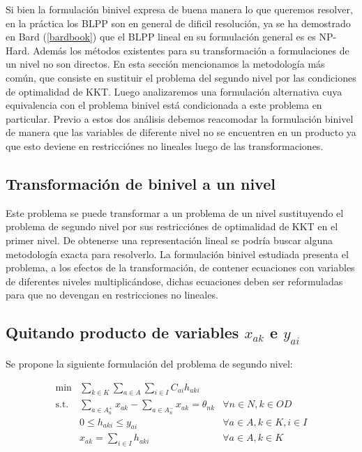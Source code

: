 \documentclass{article}
\begin{document}
  Si bien la formulación binivel expresa de buena manera lo que queremos resolver, en la práctica los BLPP son en general de dificil resolución, ya se ha demostrado en Bard (\ref{bardbook}) que el BLPP lineal en su formulación general es es NP-Hard. Además los métodos existentes para su transformación a formulaciones de un nivel no son directos. En esta sección mencionamos la metodología más común, que consiste en sustituir el problema del segundo nivel por las condiciones de optimalidad de KKT. Luego analizaremos una formulación alternativa cuya equivalencia con el problema binivel está condicionada a este problema en particular. Previo a estos dos análisis debemos reacomodar la formulación binivel de manera que las variables de diferente nivel no se encuentren en un producto ya que esto deviene en restricciónes no lineales luego de las transformaciones.

  \subsection{Transformación de binivel a un nivel}

  Este problema se puede transformar a un problema de un nivel sustituyendo el problema de segundo nivel por sus restricciónes de optimalidad de KKT en el primer nivel. De obtenerse una representación lineal se podría buscar alguna metodología exacta para resolverlo. La formulación binivel estudiada presenta el problema, a los efectos de la transformación, de contener ecuaciones con variables de diferentes niveles multiplicándose, dichas ecuaciones deben ser reformuladas para que no devengan en restricciones no lineales.

  \subsection{Quitando producto de variables $x_{ak}$ e $y_{ai}$}

  Se propone la siguiente formulación del problema de segundo nivel:

  \begin{align}
    \text{min}  & \sum_{k \in K} \sum_{a \in A} \sum_{i \in I} C_{ai} h_{aki}         & \label{eq:subproblemrefeq1} \\
    \text{s.t.} & \sum_{a \in A_n^+} x_{ak} - \sum_{a \in A_n^-} x_{ak} = \theta_{nk} & \forall n \in N, k \in OD \\
                & 0 \leq h_{aki} \leq y_{ai}                                          & \forall a \in A, k \in K, i \in I \\
                & x_{ak} = \sum_{i \in I} h_{aki}                                     & \forall a \in A, k \in K
  \end{align}
\end{document}
